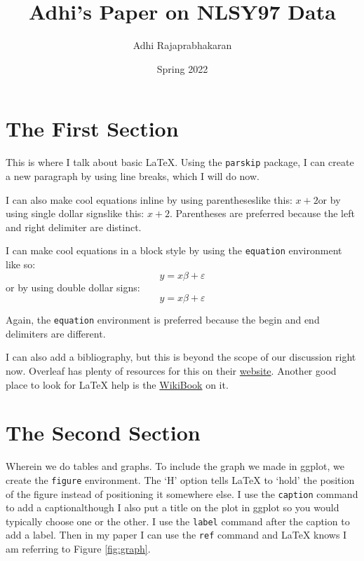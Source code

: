 \documentclass{article}
\author{Adhi Rajaprabhakaran}
\title{Adhi's Paper on NLSY97 Data}
\date{Spring 2022}
\begin{document}
\maketitle

\section{The First Section}

This is where I talk about basic \LaTeX. Using the \texttt{parskip} package, I can create a new paragraph by using line breaks, which I will do now.

I can also make cool equations inline by using parentheses{\textemdash}like this: \(x + 2\){\textemdash}or by using single dollar signs{\textemdash}like this: $x+2$. Parentheses are preferred because the left and right delimiter are distinct.

I can make cool equations in a block style by using the \texttt{equation} environment like so:
\begin{equation*}
    y = x\beta + \varepsilon
\end{equation*}
or by using double dollar signs:
$$
    y = x\beta + \varepsilon
$$

Again, the \texttt{equation} environment is preferred because the begin and end delimiters are different.

I can also add a bibliography, but this is beyond the scope of our discussion right now. Overleaf has plenty of resources for this on their \href{https://www.overleaf.com/learn}{website}. Another good place to look for LaTeX help is the \href{https://en.wikibooks.org/wiki/LaTeX}{WikiBook} on it.

\newpage

\section{The Second Section}

Wherein we do tables and graphs. To include the graph we made in ggplot, we create the \texttt{figure} environment. The `H' option tells LaTeX to `hold' the position of the figure instead of positioning it somewhere else. I use the \texttt{caption} command to add a caption{\textemdash}although I also put a title on the plot in ggplot so you would typically choose one or the other. I use the \texttt{label} command after the caption to add a label. Then in my paper I can use the \texttt{ref} command and LaTeX knows I am referring to Figure \ref{fig:graph}.
\end{document}
